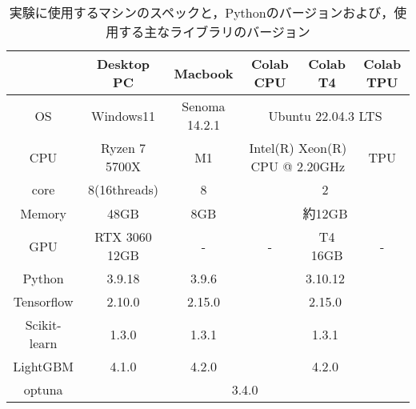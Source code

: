 \begin{table}[htbp]
    \centering
    \caption{実験に使用するマシンのスペックと，Pythonのバージョンおよび，使用する主なライブラリのバージョン}
    \label{tab:spec}
    \begin{tabular}{|c|ccccc|}
        \hline
                     & \multicolumn{1}{c|}{Desktop PC}    & \multicolumn{1}{c|}{Macbook}       & \multicolumn{1}{c|}{Colab CPU} & \multicolumn{1}{c|}{Colab T4} & Colab TPU \\ \hline
        OS           & \multicolumn{1}{c|}{Windows11}     & \multicolumn{1}{c|}{Senoma 14.2.1} & \multicolumn{3}{c|}{Ubuntu 22.04.3 LTS}                                    \\ \hline
        CPU          & \multicolumn{1}{c|}{Ryzen 7 5700X} & \multicolumn{1}{c|}{M1}            & \multicolumn{2}{c|}{Intel(R) Xeon(R) CPU @ 2.20GHz} & TPU                       \\ \hline
        core         & \multicolumn{1}{c|}{8(16threads)}  & \multicolumn{1}{c|}{8}             & \multicolumn{3}{c|}{2}                                                     \\ \hline
        Memory       & \multicolumn{1}{c|}{48GB}          & \multicolumn{1}{c|}{8GB}           & \multicolumn{3}{c|}{約12GB}                                                 \\ \hline
        GPU          & \multicolumn{1}{c|}{RTX 3060 12GB} & \multicolumn{1}{c|}{-}             & \multicolumn{1}{c|}{-}         & \multicolumn{1}{c|}{T4 16GB}  & -         \\ \hline
        Python       & \multicolumn{1}{c|}{3.9.18}        & \multicolumn{1}{c|}{3.9.6}         & \multicolumn{3}{c|}{3.10.12}                                               \\ \hline
        Tensorflow   & \multicolumn{1}{c|}{2.10.0}        & \multicolumn{1}{c|}{2.15.0}        & \multicolumn{3}{c|}{2.15.0}                                                \\ \hline
        Scikit-learn & \multicolumn{1}{c|}{1.3.0}         & \multicolumn{1}{c|}{1.3.1}         & \multicolumn{3}{c|}{1.3.1}                                                 \\ \hline
        LightGBM     & \multicolumn{1}{c|}{4.1.0}         & \multicolumn{1}{c|}{4.2.0}         & \multicolumn{3}{c|}{4.2.0}                                                 \\ \hline
        optuna       & \multicolumn{5}{c|}{3.4.0}                                                                                                                           \\ \hline
        \end{tabular}
\end{table}

\newpage